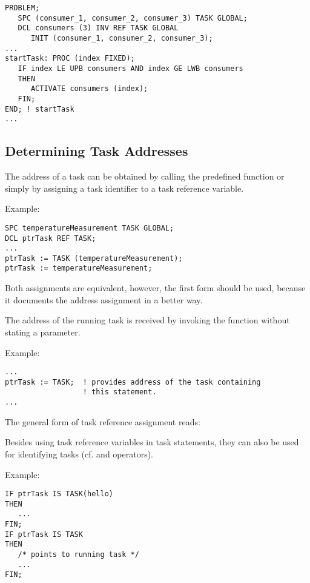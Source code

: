 \begin{lstlisting}
PROBLEM;
   SPC (consumer_1, consumer_2, consumer_3) TASK GLOBAL;
   DCL consumers (3) INV REF TASK GLOBAL
      INIT (consumer_1, consumer_2, consumer_3);
...
startTask: PROC (index FIXED);
   IF index LE UPB consumers AND index GE LWB consumers
   THEN
      ACTIVATE consumers (index);
   FIN;
END; ! startTask
...
\end{lstlisting}

\subsection{Determining Task Addresses}  %

The address of a task can be obtained by calling the predefined
function  or simply by assigning a task identifier to a task
reference variable.

Example:

\begin{lstlisting}
SPC temperatureMeasurement TASK GLOBAL;
DCL ptrTask REF TASK;
...
ptrTask := TASK (temperatureMeasurement);
ptrTask := temperatureMeasurement;
\end{lstlisting}

Both assignments are equivalent, however, the first form should be used,
because it documents the address assignment in a better way.

The address of the running task is received by invoking the function
 without stating a parameter.

Example:

\begin{lstlisting}
...
ptrTask := TASK;  ! provides address of the task containing
                  ! this statement.
...
\end{lstlisting}

The general form of task reference assignment reads:

\begin{grammarframe}
\end{grammarframe}

Besides using task reference variables in task statements, they can
also be used for identifying tasks (cf.  and  operators).

Example:

\begin{lstlisting}
IF ptrTask IS TASK(hello)
THEN
   ...
FIN;
IF ptrTask IS TASK
THEN
   /* points to running task */
   ...
FIN;
\end{lstlisting}


